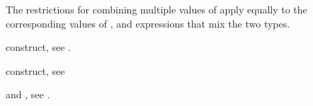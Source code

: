 The restrictions for combining multiple values of  apply equally 
to the corresponding values of , and expressions that mix the 
two types.

\begin{crossrefs}
\item {} construct, see .

\item {} construct, see

\item {} and , see
.
\end{crossrefs}
